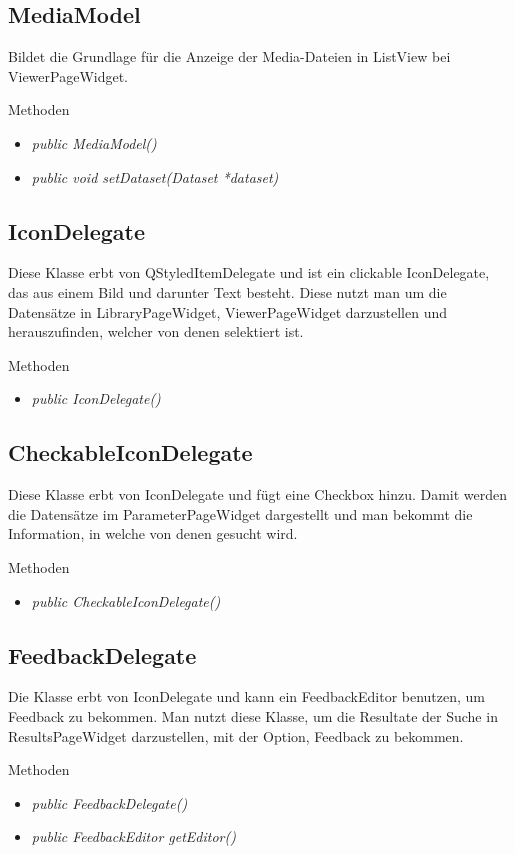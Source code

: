 \subsection*{MediaModel}
Bildet die Grundlage für die Anzeige der Media-Dateien in ListView bei ViewerPageWidget.

Methoden
\begin{itemize}
	\item\textit{public MediaModel()}
	\item\textit{public void setDataset(Dataset *dataset)}
\end{itemize}

\subsection*{IconDelegate}
Diese Klasse erbt von QStyledItemDelegate und ist ein clickable IconDelegate, das aus einem Bild und darunter Text besteht. Diese nutzt man um die Datensätze in LibraryPageWidget, ViewerPageWidget darzustellen und herauszufinden, welcher von denen selektiert ist.

Methoden
\begin{itemize}
	\item\textit{public IconDelegate()}
\end{itemize}

\subsection*{CheckableIconDelegate}
Diese Klasse erbt von IconDelegate und fügt eine Checkbox hinzu. Damit werden die Datensätze im ParameterPageWidget dargestellt und man bekommt die Information, in welche von denen gesucht wird.

Methoden
\begin{itemize}
	\item\textit{public CheckableIconDelegate()}
\end{itemize} 

\subsection*{FeedbackDelegate}
Die Klasse erbt von IconDelegate und kann ein FeedbackEditor benutzen, um Feedback zu bekommen. Man nutzt diese Klasse, um die Resultate der Suche in ResultsPageWidget darzustellen, mit der Option, Feedback zu bekommen. 

Methoden
\begin{itemize}
	\item\textit{public FeedbackDelegate()}
	\item\textit{public FeedbackEditor getEditor()}
\end{itemize}


